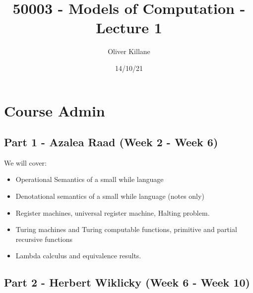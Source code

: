 \documentclass{report}
\title{50003 - Models of Computation - Lecture 1}
\author{Oliver Killane}
\date{14/10/21}
\begin{document}
    \maketitle

    \section*{Course Admin}
        \subsection*{Part 1 - Azalea Raad (Week 2 - Week 6)}
            \begin{itemize}
            \end{itemize}
            We will cover:
            \begin{itemize}
                \item Operational Semantics of a small while language
                \item Denotational semantics of a small while language (notes only)
                \item Register machines, universal register machine, Halting problem.
                \item Turing machines and Turing computable functions, primitive and partial recursive functions
                \item Lambda calculus and equivalence results.
            \end{itemize}
        \subsection*{Part 2 - Herbert Wiklicky (Week 6 - Week 10)}
            \begin{itemize}
            \end{itemize}
\end{document}
